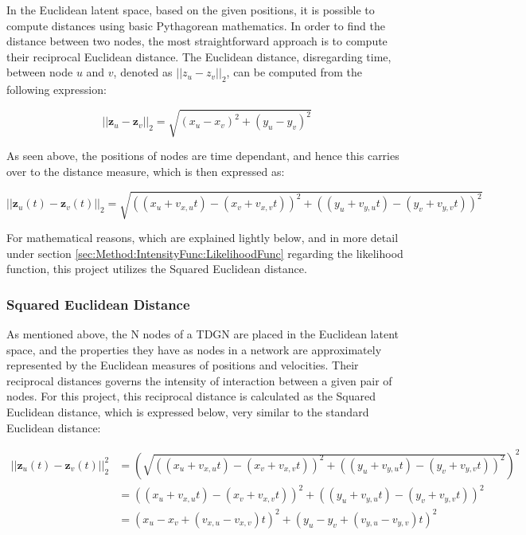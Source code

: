 In the Euclidean latent space, based on the given positions, it is possible to compute distances using basic Pythagorean mathematics. 
In order to find the distance between two nodes, the most straightforward approach is to compute their reciprocal Euclidean distance.
The Euclidean distance, disregarding time, between node $u$ and $v$, denoted as $||z_u - z_v||_2$, can be computed from the following expression:

\begin{equation}
    ||\textbf{z}_u - \textbf{z}_v||_2
= 
\sqrt{(x_u - x_v)^2 + (y_u - y_v)^2}
\end{equation}

As seen above, the positions of nodes are time dependant, and hence this carries over to the distance measure, which is then expressed as:

\begin{equation}
    ||\textbf{z}_u(t) - \textbf{z}_v(t)||_2
= 
\sqrt{((x_u + v_{x,u}t) - (x_v + v_{x,v}t))^2 + ((y_u + v_{y,u}t) - (y_v + v_{y,v}t))^2}
\end{equation}

For mathematical reasons, which are explained lightly below, and in more detail under section \ref{sec:Method:IntensityFunc:LikelihoodFunc} regarding the likelihood function, this project utilizes the Squared Euclidean distance.

\subsubsection{Squared Euclidean Distance}
\label{sec:Method:LSM:SquaredEuclideanDistance}
As mentioned above, the N nodes of a TDGN are placed in the Euclidean latent space, and the properties they have as nodes in a network are approximately represented by the Euclidean measures of positions and velocities.
Their reciprocal distances governs the intensity of interaction between a given pair of nodes.
For this project, this reciprocal distance is calculated as the Squared Euclidean distance, which is expressed below, very similar to the standard Euclidean distance:

\begin{align} 
||\textbf{z}_u(t) - \textbf{z}_v(t)||_2^2
&= 
\left(\sqrt{((x_u + v_{x,u}t) - (x_v + v_{x,v}t))^2 + ((y_u + v_{y,u}t) - (y_v + v_{y,v}t))^2}\right)^2
\\
&=
((x_u + v_{x,u}t) - (x_v + v_{x,v}t))^2 + ((y_u + v_{y,u}t) - (y_v + v_{y,v}t))^2
\\
&=
(x_u - x_v + (v_{x,u} - v_{x,v})t)^2 + (y_u - y_v + ( v_{y,u} - v_{y,v})t)^2
\label{eq:SquaredEuclideanDistance}
\end{align}


